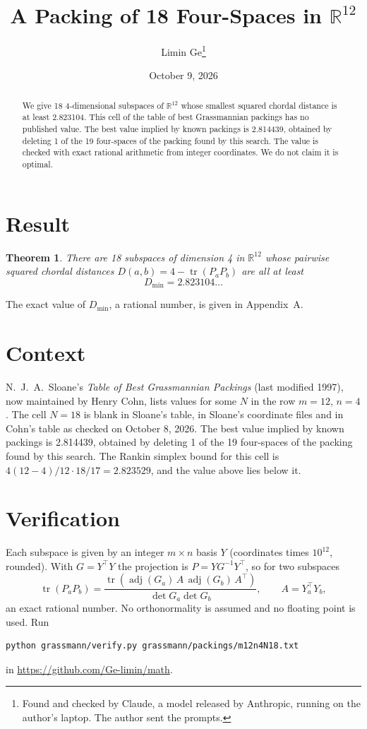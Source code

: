\documentclass[11pt,a4paper]{article}
\title{A Packing of 18 Four-Spaces in $\mathbb{R}^{12}$}
\author{Limin Ge\thanks{Found and checked by Claude, a model released by Anthropic, running on the author's laptop. The author sent the prompts.}}
\date{October 9, 2026}
\newtheorem*{theorem}{Theorem}
\begin{document}
\maketitle
\begin{abstract}
We give 18 4-dimensional subspaces of $\mathbb{R}^{12}$ whose smallest squared chordal distance is at least 2.823104. This cell of the table of best Grassmannian packings has no published value. The best value implied by known packings is 2.814439, obtained by deleting 1 of the 19 four-spaces of the packing found by this search. The value is checked with exact rational arithmetic from integer coordinates. We do not claim it is optimal.
\end{abstract}

\section{Result}
\begin{theorem}
There are 18 subspaces of dimension 4 in $\mathbb{R}^{12}$ whose pairwise squared chordal distances $D(a,b) = 4 - \operatorname{tr}(P_aP_b)$ are all at least
\[ D_{\min} = 2.823104\ldots \]
\end{theorem}
The exact value of $D_{\min}$, a rational number, is given in Appendix~A.


\section{Context}
N.~J.~A.~Sloane's \emph{Table of Best Grassmannian Packings} (last modified 1997), now maintained by Henry Cohn, lists values for some $N$ in the row $m=12$, $n=4$. The cell $N=18$ is blank in Sloane's table, in Sloane's coordinate files and in Cohn's table as checked on October 8, 2026. The best value implied by known packings is 2.814439, obtained by deleting 1 of the 19 four-spaces of the packing found by this search. The Rankin simplex bound for this cell is $4(12-4)/12\cdot 18/17 = 2.823529$, and the value above lies below it.


\section{Verification}
Each subspace is given by an integer $m\times n$ basis $Y$ (coordinates times $10^{12}$, rounded). With $G=Y^\top Y$ the projection is $P=YG^{-1}Y^\top$, so for two subspaces
\[ \operatorname{tr}(P_aP_b)=\frac{\operatorname{tr}(\operatorname{adj}(G_a)\,A\,\operatorname{adj}(G_b)\,A^\top)}{\det G_a\det G_b},\qquad A=Y_a^\top Y_b, \]
an exact rational number. No orthonormality is assumed and no floating point is used. Run
\begin{verbatim}
python grassmann/verify.py grassmann/packings/m12n4N18.txt
\end{verbatim}
in \url{https://github.com/Ge-limin/math}.
\end{document}
